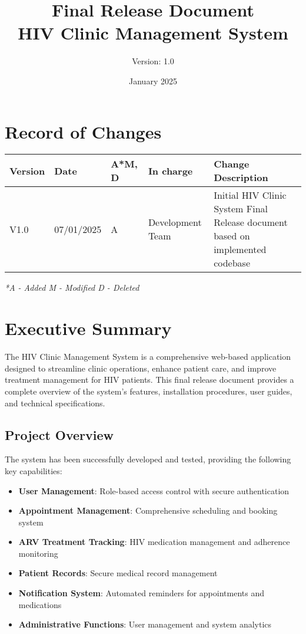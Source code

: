 \documentclass[12pt,a4paper]{article}
\title{\textbf{Final Release Document\\HIV Clinic Management System}}
\author{Version: 1.0}
\date{January 2025}
\begin{document}
\maketitle
\thispagestyle{empty}

\newpage

\section*{Record of Changes}

\begin{longtable}{|p{2cm}|p{2cm}|p{1cm}|p{3cm}|p{6cm}|}
\hline
\textbf{Version} & \textbf{Date} & \textbf{A*M, D} & \textbf{In charge} & \textbf{Change Description} \\
\hline
V1.0 & 07/01/2025 & A & Development Team & Initial HIV Clinic System Final Release document based on implemented codebase \\
\hline
\end{longtable}

\textit{*A - Added M - Modified D - Deleted}

\newpage

\tableofcontents

\newpage

\section{Executive Summary}

The HIV Clinic Management System is a comprehensive web-based application designed to streamline clinic operations, enhance patient care, and improve treatment management for HIV patients. This final release document provides a complete overview of the system's features, installation procedures, user guides, and technical specifications.

\subsection{Project Overview}

The system has been successfully developed and tested, providing the following key capabilities:

\begin{itemize}
    \item \textbf{User Management}: Role-based access control with secure authentication
    \item \textbf{Appointment Management}: Comprehensive scheduling and booking system
    \item \textbf{ARV Treatment Tracking}: HIV medication management and adherence monitoring
    \item \textbf{Patient Records}: Secure medical record management
    \item \textbf{Notification System}: Automated reminders for appointments and medications
    \item \textbf{Administrative Functions}: User management and system analytics
\end{itemize}
\end{document}

